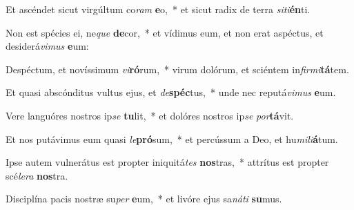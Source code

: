 \item Et ascéndet sicut virgúltum co\textit{ram} \textbf{e}o,~* et sicut radix de terra \textit{si}\textit{ti}\textbf{én}ti.
\item Non est spécies ei, ne\textit{que} \textbf{de}cor,~* et vídimus eum, et non erat aspéctus, et desiderá\textit{vi}\textit{mus} \textbf{e}um:
\item Despéctum, et novíssimum \textit{vi}\textbf{ró}rum,~* virum dolórum, et sciéntem in\textit{fir}\textit{mi}\textbf{tá}tem.
\item Et quasi abscónditus vultus ejus, et \textit{de}\textbf{spéc}tus,~* unde nec reputá\textit{vi}\textit{mus} \textbf{e}um.
\item Vere languóres nostros ip\textit{se} \textbf{tu}lit,~* et dolóres nostros ip\textit{se} \textit{por}\textbf{tá}vit.
\item Et nos putávimus eum quasi \textit{le}\textbf{pró}sum,~* et percússum a Deo, et hu\textit{mi}\textit{li}\textbf{á}tum.
\item Ipse autem vulnerátus est propter iniquitá\textit{tes} \textbf{nos}tras,~* attrítus est propter scé\textit{le}\textit{ra} \textbf{nos}tra.
\item Disciplína pacis nostræ su\textit{per} \textbf{e}um,~* et livóre ejus sa\textit{ná}\textit{ti} \textbf{su}mus.
